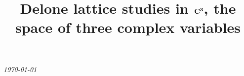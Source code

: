 \documentclass[preprint]{iucr}              %
\numberwithin{equation}{section}
\newcommand{\CIII}[0]{$\bf{C^{3}}$}
\begin{document}
	
	
	
	
	
	
	
	
	
	
	
	{\LARGE \emph{\today}} \\
	\title{Delone lattice studies in \CIII, the space of three complex variables}
	
	
\end{document}
